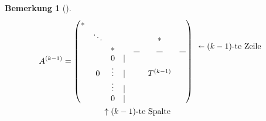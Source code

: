 \documentclass[ngerman,fontsize=11pt, paper=a4, parskip=half, titlepage=true, toc=bib]{scrbook}
\theoremstyle{definition}
\newtheorem{Bem}[Def]{Bemerkung}	%
\theoremstyle{plain}
\newenvironment{Beme}[1][]{ %
	\begin{Bem}[#1]
	}
	{
	\end{Bem}
	\addtocounter{subsection}{1}
}
\begin{document}
\begin{Beme}
  	\begin{align*}
  	A^{(k-1)} &=
  	\begin{pmatrix}
  	*  &&&&&\\
  	&\ddots &&&& * \\
  	&&*&&\_&\_&\_ \\
  	&&0&|&\\
  	&0&\vdots&| &&T^{(k-1)}\\
  	&&\vdots&  |\\
  	&&0&  |
  	\end{pmatrix}
  	\begin{array}{l}
  	\\
  	\shortleftarrow (k-1) \text{-te Zeile} \\
  	\\\\\\\\
  	\end{array}\\
  	&\phantom{= \, (} \begin{array}{ccl}
  	~&~&~ \uparrow (k-1)\text{-te Spalte}
  	\end{array}
  	\end{align*}
  	

\end{Beme}
\end{document}
